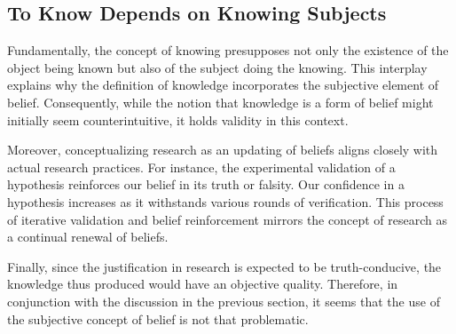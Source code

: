 
\subsection{To Know Depends on Knowing Subjects}

Fundamentally, the concept of knowing presupposes not only the existence of the object being known but also of the subject doing the knowing. This interplay explains why the definition of knowledge incorporates the subjective element of belief. Consequently, while the notion that knowledge is a form of belief might initially seem counterintuitive, it holds validity in this context. 

Moreover, conceptualizing research as an updating of beliefs aligns closely with actual research practices. For instance, the experimental validation of a hypothesis reinforces our belief in its truth or falsity. Our confidence in a hypothesis increases as it withstands various rounds of verification. This process of iterative validation and belief reinforcement mirrors the concept of research as a continual renewal of beliefs.

Finally, since the justification in research is expected to be truth-conducive, the knowledge thus produced would have an objective quality. Therefore, in conjunction with the discussion in the previous section, it seems that the use of the subjective concept of belief is not that problematic.




